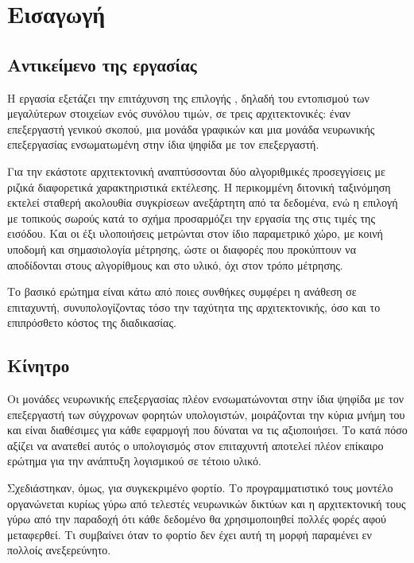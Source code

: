 \chapter{Εισαγωγή}
\label{ch:intro}

\section{Αντικείμενο της εργασίας}
\label{sec:intro-scope}

Η εργασία εξετάζει την επιτάχυνση της επιλογής , δηλαδή του
εντοπισμού των  μεγαλύτερων στοιχείων ενός συνόλου  τιμών, σε τρεις
αρχιτεκτονικές: έναν επεξεργαστή γενικού σκοπού, μια μονάδα γραφικών και μια
μονάδα νευρωνικής επεξεργασίας ενσωματωμένη στην ίδια ψηφίδα με τον
επεξεργαστή.

Για την εκάστοτε αρχιτεκτονική αναπτύσσονται δύο αλγοριθμικές προσεγγίσεις με
ριζικά διαφορετικά χαρακτηριστικά εκτέλεσης. Η περικομμένη διτονική ταξινόμηση
εκτελεί σταθερή ακολουθία συγκρίσεων ανεξάρτητη από τα δεδομένα, ενώ η επιλογή
με τοπικούς σωρούς κατά το σχήμα  προσαρμόζει την εργασία της
στις τιμές της εισόδου. Και οι έξι υλοποιήσεις μετρώνται στον ίδιο παραμετρικό
χώρο, με κοινή υποδομή και σημασιολογία μέτρησης, ώστε οι διαφορές που
προκύπτουν να αποδίδονται στους αλγορίθμους και στο υλικό, όχι στον τρόπο
μέτρησης.

Το βασικό ερώτημα είναι κάτω από ποιες συνθήκες συμφέρει η ανάθεση σε
επιταχυντή, συνυπολογίζοντας τόσο την ταχύτητα της αρχιτεκτονικής, όσο και το
επιπρόσθετο κόστος της διαδικασίας.

\section{Κίνητρο}
\label{sec:intro-motivation}

Οι μονάδες νευρωνικής επεξεργασίας πλέον ενσωματώνονται στην ίδια ψηφίδα με τον
επεξεργαστή των σύγχρονων φορητών υπολογιστών, μοιράζονται την κύρια μνήμη του
και είναι διαθέσιμες για κάθε εφαρμογή που δύναται να τις αξιοποιήσει. Το κατά
πόσο αξίζει να ανατεθεί αυτός ο υπολογισμός στον επιταχυντή αποτελεί πλέον
επίκαιρο ερώτημα για την ανάπτυξη λογισμικού σε τέτοιο υλικό.

Σχεδιάστηκαν, όμως, για συγκεκριμένο φορτίο. Το προγραμματιστικό τους μοντέλο
οργανώνεται κυρίως γύρω από τελεστές νευρωνικών δικτύων και η αρχιτεκτονική
τους γύρω από την παραδοχή ότι κάθε δεδομένο θα χρησιμοποιηθεί πολλές φορές
αφού μεταφερθεί. Τι συμβαίνει όταν το φορτίο δεν έχει αυτή τη μορφή παραμένει
εν πολλοίς ανεξερεύνητο.

